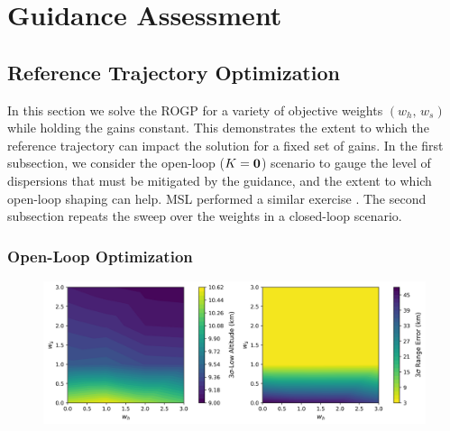 \chapter{Guidance Assessment}\label{Ch:NumericalAssessment}

\section{Reference Trajectory Optimization}
In this section we solve the ROGP for a variety of objective weights $(w_h,\,w_s)$ while holding the gains constant. This demonstrates the extent to which the reference trajectory can impact the solution for a fixed set of gains. In the first subsection, we consider the open-loop ($K=\mathbf{0}$) scenario to gauge the level of dispersions that must be mitigated by the guidance, and the extent to which open-loop shaping can help. MSL performed a similar exercise \cite{MSL_EDL2}. The second subsection repeats the sweep over the weights in a closed-loop scenario.
\subsection{Open-Loop Optimization}
\begin{figure}[h!]
	\centering
	\includegraphics[width=1\textwidth]{Images/Reoptimized_WeightSweepMCResults}
	\caption{}
	\label{Fig:MCResultsOpenLoop}
\end{figure}

